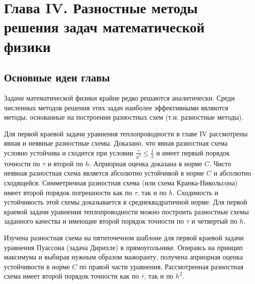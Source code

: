 \newpage
{}
\pagestyle{empty}
\vspace{0.5cm}

\section*{Глава IV. Разностные методы решения задач математической физики}

\subsection{Основные идеи главы}

Задачи математической физики крайне редко решаются аналитически. Среди численных методов решения этих задач наиболее эффективными являются методы, основанные на построении разностных схем (т.н. разностные методы).

Для первой краевой задачи уравнения теплопроводности в главе IV рассмотрены явная и неявные разностные схемы. Доказано, что явная разностная схема условно устойчива и сходится при условии \begin{math} \frac{\tau}{h^2} \leq \frac{1}{2} \end{math} и имеет первый порядок точности по $\tau$ и второй по $h$. Априорная оценка доказана в норме $C$. Чисто неявная разностная схема является абсолютно устойчивой в норме $C$ и абсолютно сходящейся. Симметричная разностная схема (или схема Кранка-Никольсона) имеет второй порядок погрешности как по $\tau$, так и по $h$. Сходимость и устойчивость этой схемы доказывается в среднеквадратичной норме. Для первой краевой задачи уравнения теплопроводности можно построить разностные схемы заданного качества и имеющие второй порядок точности по $\tau$ и четвертый по $h$.

Изучена разностная схема на пятиточечном шаблоне для первой краевой задачи уравнения Пуассона (задача Дирихле) в прямоугольнике. Опираясь на принцип максимума и выбирая нужным образом мажоранту, получена априорная оценка устойчивости в норме $C$ по правой части уравнения. Рассмотренная разностная схема имеет второй порядок точности как по $\tau$, так и по \begin{math} h^2 \end{math}.

\newpage

